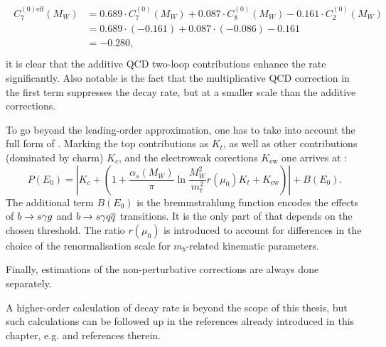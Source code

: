 \begin{align}
    \begin{split}
        C_7^{(0)\mathrm{eff}}(M_W) &= 0.689 \cdot C_7^{(0)}(M_W) + 0.087 \cdot C_8^{(0)}(M_W) - 0.161 \cdot C_2^{(0)}(M_W)  \\ 
                          &= 0.689 \cdot (-0.161) + 0.087 \cdot (-0.086) - 0.161\\
                          &= -0.280, \\
    \end{split}
\end{align}
it is clear that the additive QCD two-loop contributions enhance the rate significantly.
Also notable is the fact that the multiplicative QCD correction in the first term suppresses the decay rate, but at a smaller scale than the additive corrections.



To go beyond the leading-order approximation, one has to take into account the full form of .
Marking the top contributions as $K_t$, as well as other contributions (dominated by charm) $K_c$, and the electroweak corections $K_{\mathrm{ew}}$ one arrives at \cite{Gambino:2001ew}:
\begin{equation}\label{eq:perturbative_entry}
    P(E_0) = \left| K_c + \left(1+\frac{\alpha_s(M_W)}{\pi} \ln\frac{M_W^2}{m_t^2}r(\mu_0)K_t+K_{\mathrm{ew}}\right)\right| +B(E_0).
\end{equation}
The additional term $B(E_0)$ is the bremmstrahlung function encodes the effects of $b\rightarrow s\gamma g$ and $b\rightarrow s\gamma q\overline q$ transitions.
It is the only part of  that depends on the chosen \Egamma threshold.
The ratio $r(\mu_0)$ is introduced to account for differences in the choice of the renormalisation scale for $m_b$-related kinematic parameters.

Finally, estimations of the non-perturbative corrections are always done separately.

A higher-order calculation of \BtoXsgamma decay rate is beyond the scope of this thesis, but such calculations can be followed up in the references already introduced in this chapter, e.g. \cite{Misiak:2020vlo} and references therein.

